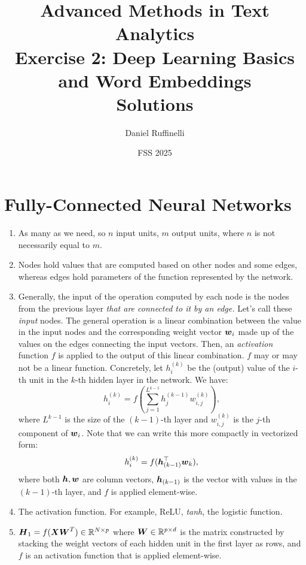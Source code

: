 \documentclass[11pt,a4paper]{article}
\title{Advanced Methods in Text Analytics \\ 
Exercise 2: Deep Learning Basics and Word Embeddings \\ 
\textbf{Solutions}}
\author{Daniel Ruffinelli}
\date{FSS 2025}
\begin{document}
\maketitle

\section{Fully-Connected Neural Networks}

\begin{enumerate}[label=(\alph*)]
    \item As many as we need, so $n$ input units, $m$ output units, where $n$ is
          not necessarily equal to $m$.
    \item Nodes hold values that are computed based on other nodes and some
          edges, whereas edges hold parameters of the function represented by
          the network.
    \item Generally, the input of the operation computed by each node is the
          nodes from the previous layer
          \emph{that are connected to it by an edge.}
          Let's call these \emph{input} nodes.
          The general operation is a linear combination between the value in the
          input nodes and the corresponding weight vector ${\boldsymbol{w}}_i$ made up of the
          values on the edges connecting the input vectors.
          Then, an \emph{activation} function $f$ is applied to the output of
          this linear combination.
          $f$ may or may not be a linear function.
          Concretely, let $h_i^{(k)}$ be the (output) value of the $i$-th unit
          in the $k$-th hidden layer in the network.
          We have:
          \begin{equation*}
              h^{(k)}_i = f\left(\sum_{j=1}^{L^{k-1}}{h_j^{(k-1)} w_{i,j}^{(k)}}\right),
          \end{equation*}
          where $L^{k-1}$ is the size of the $(k-1)$-th layer and
          $w_{i,j}^{(k)}$ is the $j$-th component of ${\boldsymbol{w}}_i$.
          Note that we can write this more compactly in vectorized form:
          \begin{equation*}
              h^{(k)}_i = f({\boldsymbol{h}}_{(k-1)}^\top{\boldsymbol{w}}_k),
          \end{equation*}
          where both ${\boldsymbol{h}},{\boldsymbol{w}}$ are column vectors, ${\boldsymbol{h}}_{(k-1)}$ is the vector
          with values in the $(k-1)$-th layer, and $f$ is applied element-wise.
    \item The activation function. For example, ReLU, \emph{tanh}, the
          logistic function.
    \item ${\boldsymbol{H}}_1=f({\boldsymbol{X}}{\boldsymbol{W}}^T)\in\mathbb{R}^{N\times p}$ where
          ${\boldsymbol{W}}\in\mathbb{R}^{p\times d}$ is the matrix constructed by stacking the
          weight vectors of each hidden unit in the first layer as rows, and $f$
          is an activation function that is applied element-wise.
\end{enumerate}
\end{document}
